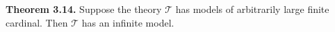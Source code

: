 \textbf{Theorem 3.14.} Suppose the theory $\mathcal{T}$ has models of arbitrarily large finite cardinal. Then $\mathcal{T}$ has an infinite model.
